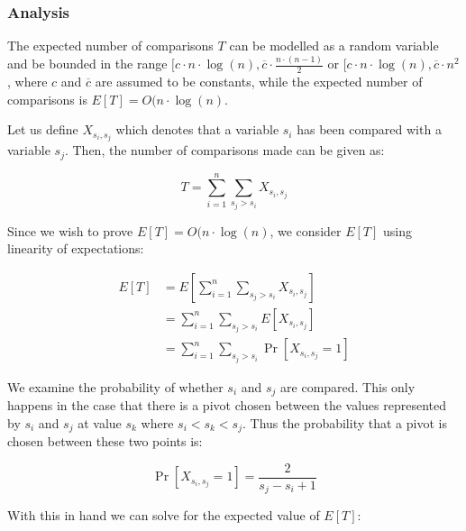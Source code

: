         \subsubsection*{Analysis}
            The expected number of comparisons \(T\) can be modelled as a random variable and be bounded in the range \([c \cdot n \cdot \log(n), \overline{c} \cdot \frac{n \cdot (n - 1)}{2}\) or \([c \cdot n \cdot \log(n), \overline{c} \cdot n^2\), where \(c\) and \(\overline{c}\) are assumed to be constants, while the expected number of comparisons is \(E[T] = O(n \cdot \log(n)\).

            Let us define \(X_{s_i, s_j}\) which denotes that a variable \(s_i\) has been compared with a variable \(s_j\). Then, the number of comparisons made can be given as:

            \[
                T = \sum_{i = 1}^{n} \sum_{s_j > s_i} X_{s_i, s_j}
            \]

            Since we wish to prove \(E[T] = O(n \cdot \log(n)\), we consider \(E[T]\) using linearity of expectations:

            \[
                \begin{aligned}
                    E[T] & = E[\sum_{i = 1}^{n} \sum_{s_j > s_i} X_{s_i, s_j}]\\
                    & = \sum_{i = 1}^{n} \sum_{s_j > s_i} E[X_{s_i, s_j}]\\
                    & = \sum_{i = 1}^{n} \sum_{s_j > s_i} \Pr[X_{s_i, s_j} = 1]
                \end{aligned}
            \]

        We examine the probability of whether \(s_i\) and \(s_j\) are compared. This only happens in the case that there is a pivot chosen between the values represented by \(s_i\) and \(s_j\) at value \(s_k\) where \(s_i < s_k < s_j\). Thus the probability that a pivot is chosen between these two points is:

        \[
            \Pr[X_{s_i, s_j} = 1] = \frac{2}{s_j - s_i + 1}
        \]

        With this in hand we can solve for the expected value of \(E[T]\):

